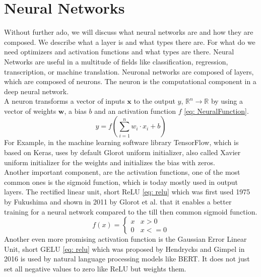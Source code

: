 \section{Neural Networks}\label{sec:neural-networks}
Without further ado, we will discuss what neural networks are and how they are composed.
We describe what a layer is and what types there are.
For what do we need optimizers and activation functions and what types are there.
Neural Networks are useful in a multitude of fields like classification, regression, transcription, or machine translation. \cite{goodfellow_deep_2016}
Neuronal networks are composed of layers, which are composed of neurons.
The neuron is the computational component in a deep neural network.\\
A neuron transforms a vector of inputs $\mathbf{x}$ to the output $y$, $\mathbb{R}^n \to \mathbb{R}$
by using a vector of weights $\mathbf{w}$, a bias $b$ and an activation function $f$ \ref{eq: NeuralFunction}.
\begin{equation}
    y = f\left( \sum^n_{i=1} w_i\cdot x_i + b\right)
    \label{eq: NeuralFunction}
\end{equation}
For Example, in the machine learning software library TensorFlow, which is based on Keras, uses by default Glorot uniform initializer\cite{noauthor_tfkeraslayersdense_nodate,glorot_understanding_2010},
also called Xavier uniform initializer for the weights and initializes the bias with zeros.\\
Another important component, are the activation functions, one of the most common ones is the sigmoid function, which is today mostly used in output layers.
The rectified linear unit, short ReLU \ref{eq: relu} which was first used 1975 by Fukushima\cite{fukushima_cognitron_1975} and shown in 2011 by Glorot et al. \cite{glorot_deep_2011}
that it enables a better training for a neural network compared to the till then common sigmoid function.
\begin{equation}
    f(x) =
    \begin{cases}
        x& x > 0\\
        0& x <= 0
    \end{cases}
    \label{eq: relu}
\end{equation}
Another even more promising activation function is the Gaussian Error Linear Unit, short GELU \ref{eq: relu} which was proposed by Hendrycks and Gimpel in 2016\cite{hendrycks_gaussian_2016} is used by natural language processing models like BERT\cite{devlin_bert_2019}.
It does not just set all negative values to zero like ReLU but weights them.
